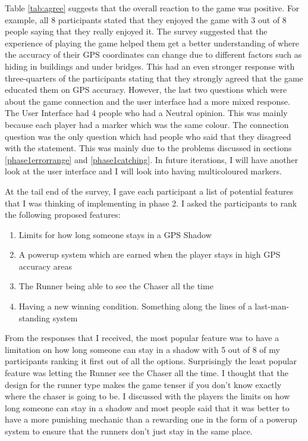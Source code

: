 \documentclass{l4proj}
\begin{document}
Table \ref{tab:agree} suggests that the overall reaction to the game was positive. For example, all 8 participants stated
that they enjoyed the game with 3 out of 8 people saying that they really enjoyed it. The survey suggested that the experience
of playing the game helped them get a better understanding of where the accuracy of their GPS coordinates can change due to different
factors such as hiding in buildings and under bridges. This had an even stronger response with three-quarters of the participants
stating that they strongly agreed that the game educated them on GPS accuracy. However, the last two questions which were
about the game connection and the user interface had a more mixed response. The User Interface had 4 people who had a Neutral
opinion. This was mainly because each player had a marker which was the same colour. The connection question
was the only question which had people who said that they disagreed with the statement. This was mainly due to the problems discussed
in sections \ref{phase1errorrange} and \ref{phase1catching}. In future iterations, I will have another look at the user interface
and I will look into having multicoloured markers.

At the tail end of the survey, I gave each participant a list of potential features that I was thinking of implementing in phase 2.
I asked the participants to rank the following proposed features:

\begin{enumerate}
    \item Limits for how long someone stays in a GPS Shadow
    \item A powerup system which are earned when the player stays in high GPS accuracy areas
    \item The Runner being able to see the Chaser all the time
    \item Having a new winning condition. Something along the lines of a last-man-standing system
\end{enumerate}

From the responses that I received, the most popular feature was to have a limitation on how long someone can stay in a shadow with
5 out of 8 of my participants ranking it first out of all the options. Surprisingly the least popular feature was letting the Runner see the Chaser all the time.
I thought that the design for the runner type makes the game tenser if you don't know exactly where the chaser is going to be.
I discussed with the players the limits on how long someone can stay in a shadow and most people said that it was better to have
a more punishing mechanic than a rewarding one in the form of a powerup system to ensure that the runners don't just stay in the same place.
\end{document}

